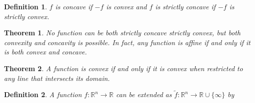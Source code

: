 \documentclass[a4paper]{article}
\newtheorem{mytheorem}{Theorem}
\newtheorem{mydef}{Definition}
\numberwithin{mytheorem}{section}
\numberwithin{mydef}{section}
\numberwithin{example}{section}
\begin{document}
\begin{mydef} $f$ is concave if $-f$ is convex and $f$ is strictly concave if $-f$ is strictly convex.  \end{mydef}

\begin{mytheorem} No function can be both strictly concave strictly convex, but both convexity and concavity is possible. In fact, any function is affine if and only if it is both convex and concave. \end{mytheorem}

\begin{mytheorem} A function is convex if and only if it is convex when restricted to any line that intersects its domain. \end{mytheorem}

\begin{mydef} A function $f : \mathbb{R}^{n} \rightarrow \mathbb{R}$ can be extended as $\widetilde{f} : \mathbb{R}^{n} \rightarrow \mathbb{R} \cup \{ \infty \}$ by 
\end{mydef}
\end{document}
